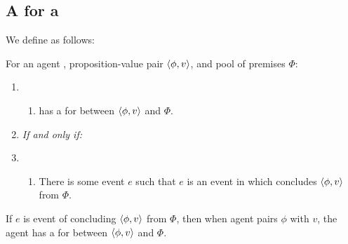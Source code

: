\subsection{A  for a }
\label{cha:var:support:W}

\begin{note}
  We define \wit{} as follows:

  \begin{definition}[A \wit{2}]
    \label{def:witnessing}
    For an agent \vAgent{}, proposition-value pair \(\langle \phi, v \rangle\), and pool of premises \(\Phi\):

    \begin{enumerate}[label=]
    \item
      \begin{enumerate}[label=\alph*., ref=(\alph*), series=WitnessDef]
      \item
        \vAgent{} has a \emph{} for \ros{} between \(\langle \phi, v \rangle\) and \(\Phi\).
      \end{enumerate}
    \item
      \emph{If and only if:}
    \item
      \begin{enumerate}[label=\alph*., ref=(\alph*), resume*=WitnessDef]
      \item
        There is some event \(e\) such that \(e\) is an event in which \vAgent{} concludes \(\langle \phi, v \rangle\) from \(\Phi\).
      \end{enumerate}
    \end{enumerate}
    \vspace{-\baselineskip}
  \end{definition}

  If \(e\) is event of concluding \(\langle \phi, v \rangle\) from \(\Phi\), then when agent pairs \(\phi\) with \(v\), the agent has a \wit{} for \ros{} between \(\langle \phi, v \rangle\) and \(\Phi\).
\end{note}


